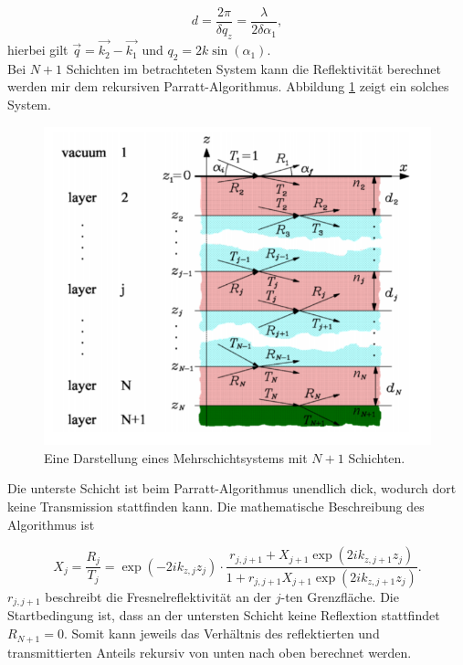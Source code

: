 \documentclass[
  bibliography=totoc,     %
  captions=tableheading,  %
  titlepage=firstiscover, %
]{scrartcl}
\begin{document}
\begin{equation*}
    d = \frac{2\pi}{\delta q_z} = \frac{\lambda}{2\delta\alpha_1},
\end{equation*}
hierbei gilt $\vec{q} = \vec{k_2}-\vec{k_1}$ und $q_2 = 2k\sin{\left(\alpha_1\right)}$.\\
\noindent
Bei $N+1$ Schichten im betrachteten System kann die Reflektivität berechnet werden mir dem rekursiven Parratt-Algorithmus.
Abbildung \ref{fig:ns} zeigt ein solches System.

\begin{figure}
    \centering
    \includegraphics[scale=0.6]{images/Zwei.png}
    \caption{Eine Darstellung eines Mehrschichtsystems mit $N+1$ Schichten.\cite{Pynn}}
    \label{fig:ns}
  \end{figure}
\noindent
Die unterste Schicht ist beim Parratt-Algorithmus unendlich dick, wodurch dort keine Transmission stattfinden kann.
Die mathematische Beschreibung des Algorithmus ist

\begin{equation*}
    X_j = \frac{R_j}{T_j} = \exp{\left(-2ik_{z,j}z_j\right)}\cdot \frac{r_{j,j+1}+X_{j+1}\exp{\left(2ik_{z,j+1}z_j\right)}}{1+r_{j,j+1}X_{j+1}\exp{\left(2ik_{z,j+1}z_j\right)}}.
\end{equation*}
\noindent
$r_{j,j+1}$ beschreibt die Fresnelreflektivität an der $j$-ten Grenzfläche.
Die Startbedingung ist, dass an der untersten Schicht keine Reflextion stattfindet $R_{N+1} = 0$. Somit kann jeweils
das Verhältnis des reflektierten und transmittierten Anteils rekursiv von unten nach oben berechnet werden.
\end{document}
